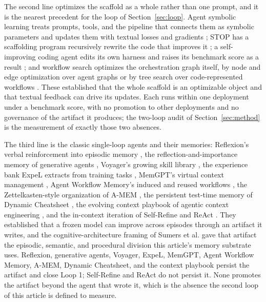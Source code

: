 \documentclass[
  11pt,
]{article}
\begin{document}
The second line optimizes the scaffold as a whole rather than one prompt, and it is the nearest precedent for the loop of Section~\ref{sec:loop}. Agent symbolic learning treats prompts, tools, and the pipeline that connects them as symbolic parameters and updates them with textual losses and gradients \cite{zhou2024symbolic}; STOP has a scaffolding program recursively rewrite the code that improves it \cite{zelikman2023stop}; a self-improving coding agent edits its own harness and raises its benchmark score as a result \cite{robeyns2025sica}; and workflow search optimizes the orchestration graph itself, by node and edge optimization over agent graphs \cite{zhuge2024gptswarm} or by tree search over code-represented workflows \cite{zhang2024aflow}. These established that the whole scaffold is an optimizable object and that textual feedback can drive its updates. Each runs within one deployment under a benchmark score, with no promotion to other deployments and no governance of the artifact it produces; the two-loop audit of Section~\ref{sec:method} is the measurement of exactly those two absences.

The third line is the classic single-loop agents and their memories: Reflexion's verbal reinforcement into episodic memory \cite{shinn2023reflexion}, the reflection-and-importance memory of generative agents \cite{park2023generative}, Voyager's growing skill library \cite{wang2023voyager}, the experience bank ExpeL extracts from training tasks \cite{zhao2024expel}, MemGPT's virtual context management \cite{packer2023memgpt}, Agent Workflow Memory's induced and reused workflows \cite{wang2024awm}, the Zettelkasten-style organization of A-MEM \cite{xu2025amem}, the persistent test-time memory of Dynamic Cheatsheet \cite{suzgun2025cheatsheet}, the evolving context playbook of agentic context engineering \cite{ace2025agentic}, and the in-context iteration of Self-Refine and ReAct \cite{madaan2023selfrefine, yao2023react}. They established that a frozen model can improve across episodes through an artifact it writes, and the cognitive-architecture framing of Sumers et al. \cite{sumers2023coala} gave that artifact the episodic, semantic, and procedural division this article's memory substrate uses. Reflexion, generative agents, Voyager, ExpeL, MemGPT, Agent Workflow Memory, A-MEM, Dynamic Cheatsheet, and the context playbook persist the artifact and close Loop 1; Self-Refine and ReAct do not persist it. None promotes the artifact beyond the agent that wrote it, which is the absence the second loop of this article is defined to measure.
\end{document}
